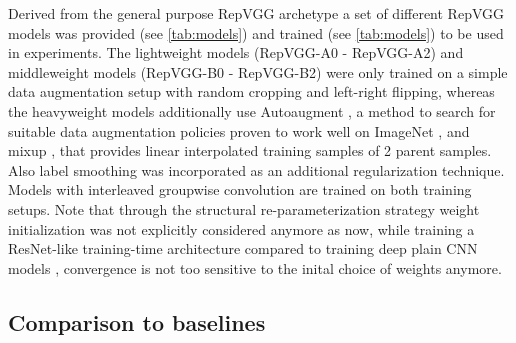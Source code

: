 Derived from the general purpose RepVGG archetype a set of different RepVGG models was provided (see \autoref{tab:models}) and trained (see \autoref{tab:models}) to be used in experiments. The lightweight models (RepVGG-A0 - RepVGG-A2) and middleweight models (RepVGG-B0 - RepVGG-B2) were only trained on a simple data augmentation setup \cite{PyTorch.2020} with random cropping and left-right flipping, whereas the heavyweight models additionally use Autoaugment \cite{EkinDCubuk.2019}, a method to search for suitable data augmentation policies proven to work well on ImageNet \cite{JiaDeng.2009}, and mixup \cite{HongyiZhang.2018}, that provides linear interpolated training samples of 2 parent samples. Also label smoothing \cite{ChristianSzegedy.2015} was incorporated as an additional regularization technique. Models with interleaved groupwise convolution are trained on both training setups. Note that through the structural re-parameterization strategy weight initialization was not explicitly considered anymore as now, while training a ResNet-like training-time architecture compared to training deep plain CNN models \cite{LechaoXiao.2018, OyebadeOyedotun.2020}, convergence is not too sensitive to the inital choice of weights anymore.

\subsection{Comparison to baselines}


